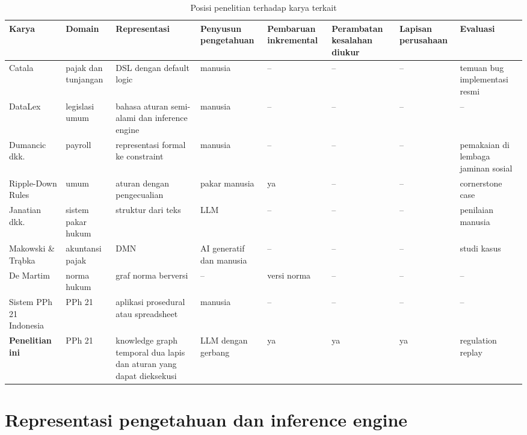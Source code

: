 \documentclass[journal,a4paper]{IEEEtran}
\makeatletter
\DeclareRobustCommand{\en}[1]{{\usefont{\f@encoding}{\f@family}{\f@series}{it}#1\/}}
\makeatother
\begin{document}
\begin{table}[t]
\centering
\caption{Posisi penelitian terhadap karya terkait}
\label{tab:posisi}
\scriptsize
\begin{tabularx}{\textwidth}{@{}P{2.9cm} P{1.9cm} L P{1.9cm} P{1.4cm} P{1.5cm} P{1.3cm} P{2.3cm}@{}}
\toprule
\textbf{Karya} & \textbf{Domain} & \textbf{Representasi} & \textbf{Penyusun pengetahuan} & \textbf{Pembaruan inkremental} & \textbf{Perambatan kesalahan diukur} & \textbf{Lapisan perusahaan} & \textbf{Evaluasi} \\
\midrule
Catala~\cite{merigoux2021catala,huttner2022catala} & pajak dan tunjangan & DSL dengan \en{default logic} & manusia & -- & -- & -- & temuan \en{bug} implementasi resmi \\
DataLex~\cite{mowbray2023scaling,mowbray2023xai} & legislasi umum & bahasa aturan semi-alami dan \en{inference engine} & manusia & -- & -- & -- & -- \\
Dumancic dkk.~\cite{dumancic2021payroll} & \en{payroll} & representasi formal ke \en{constraint} & manusia & -- & -- & -- & pemakaian di lembaga jaminan sosial \\
\en{Ripple-Down Rules}~\cite{compton2021rdr} & umum & aturan dengan pengecualian & pakar manusia & ya & -- & -- & \en{cornerstone case} \\
Janatian dkk.~\cite{janatian2023texttostructure} & sistem pakar hukum & struktur dari teks & LLM & -- & -- & -- & penilaian manusia \\
Makowski \& Tr\k{a}bka~\cite{makowski2025dmn} & akuntansi pajak & DMN & AI generatif dan manusia & -- & -- & -- & studi kasus \\
De Martim~\cite{demartim2025satgraph} & norma hukum & graf norma berversi & -- & versi norma & -- & -- & -- \\
Sistem PPh 21 Indonesia~\cite{ramadhani2021grossup,yulistyawati2022payroll,kusuma2026pph21} & PPh 21 & aplikasi prosedural atau \en{spreadsheet} & manusia & -- & -- & -- & -- \\
\midrule
\textbf{Penelitian ini} & PPh 21 & \en{knowledge graph} temporal dua lapis dan aturan yang dapat dieksekusi & LLM dengan gerbang & ya & ya & ya & \en{regulation replay} \\
\bottomrule
\end{tabularx}
\end{table}

\section{Representasi pengetahuan dan \en{inference engine}}
\label{sec:representasi}
\end{document}
